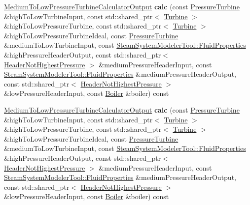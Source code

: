 \begin{DoxyCompactItemize}
\hyperlink{class_medium_to_low_pressure_turbine_calculator_output}{Medium\+To\+Low\+Pressure\+Turbine\+Calculator\+Output} {\bfseries calc} (const \hyperlink{class_pressure_turbine}{Pressure\+Turbine} \&high\+To\+Low\+Turbine\+Input, const std\+::shared\+\_\+ptr$<$ \hyperlink{class_turbine}{Turbine} $>$ \&high\+To\+Low\+Pressure\+Turbine, const std\+::shared\+\_\+ptr$<$ \hyperlink{class_turbine}{Turbine} $>$ \&high\+To\+Low\+Pressure\+Turbine\+Ideal, const \hyperlink{class_pressure_turbine}{Pressure\+Turbine} \&medium\+To\+Low\+Turbine\+Input, const \hyperlink{struct_steam_system_modeler_tool_1_1_fluid_properties}{Steam\+System\+Modeler\+Tool\+::\+Fluid\+Properties} \&high\+Pressure\+Header\+Output, const std\+::shared\+\_\+ptr$<$ \hyperlink{class_header_not_highest_pressure}{Header\+Not\+Highest\+Pressure} $>$ \&medium\+Pressure\+Header\+Input, const \hyperlink{struct_steam_system_modeler_tool_1_1_fluid_properties}{Steam\+System\+Modeler\+Tool\+::\+Fluid\+Properties} \&medium\+Pressure\+Header\+Output, const std\+::shared\+\_\+ptr$<$ \hyperlink{class_header_not_highest_pressure}{Header\+Not\+Highest\+Pressure} $>$ \&low\+Pressure\+Header\+Input, const \hyperlink{class_boiler}{Boiler} \&boiler) const
\item 
\mbox{\label{class_medium_to_low_pressure_turbine_calculator_aca7259610c8db3bce4d434a9faa0f7f9}} 
\hyperlink{class_medium_to_low_pressure_turbine_calculator_output}{Medium\+To\+Low\+Pressure\+Turbine\+Calculator\+Output} {\bfseries calc} (const \hyperlink{class_pressure_turbine}{Pressure\+Turbine} \&high\+To\+Low\+Turbine\+Input, const std\+::shared\+\_\+ptr$<$ \hyperlink{class_turbine}{Turbine} $>$ \&high\+To\+Low\+Pressure\+Turbine, const std\+::shared\+\_\+ptr$<$ \hyperlink{class_turbine}{Turbine} $>$ \&high\+To\+Low\+Pressure\+Turbine\+Ideal, const \hyperlink{class_pressure_turbine}{Pressure\+Turbine} \&medium\+To\+Low\+Turbine\+Input, const \hyperlink{struct_steam_system_modeler_tool_1_1_fluid_properties}{Steam\+System\+Modeler\+Tool\+::\+Fluid\+Properties} \&high\+Pressure\+Header\+Output, const std\+::shared\+\_\+ptr$<$ \hyperlink{class_header_not_highest_pressure}{Header\+Not\+Highest\+Pressure} $>$ \&medium\+Pressure\+Header\+Input, const \hyperlink{struct_steam_system_modeler_tool_1_1_fluid_properties}{Steam\+System\+Modeler\+Tool\+::\+Fluid\+Properties} \&medium\+Pressure\+Header\+Output, const std\+::shared\+\_\+ptr$<$ \hyperlink{class_header_not_highest_pressure}{Header\+Not\+Highest\+Pressure} $>$ \&low\+Pressure\+Header\+Input, const \hyperlink{class_boiler}{Boiler} \&boiler) const
\end{DoxyCompactItemize}


